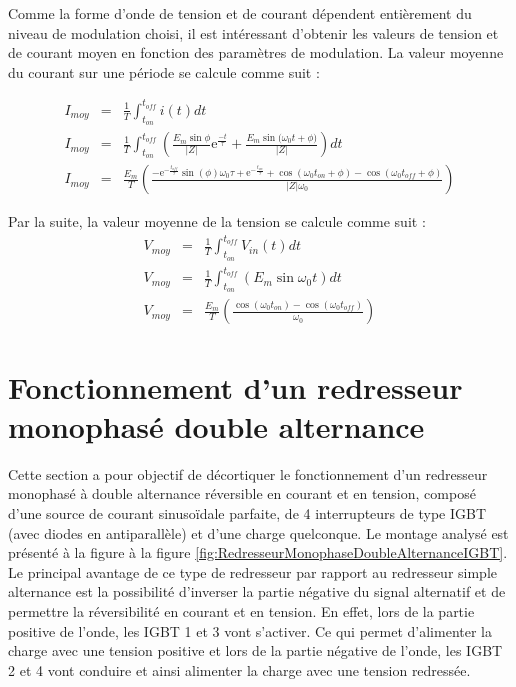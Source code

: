 Comme la forme d'onde de tension et de courant dépendent entièrement du niveau de modulation choisi, il est intéressant d'obtenir les valeurs de tension et de courant moyen en fonction des paramètres de modulation. La valeur moyenne du courant sur une période se calcule comme suit :

\begin{eqnarray}
I_{moy} &=& \frac{1}{T}\int_{t_{on}}^{t_{off}} i(t) dt \\
I_{moy} &=& \frac{1}{T}\int_{t_{on}}^{t_{off}} \left( \frac{E_m\sin{\phi}}{|Z|}\mbox{e}^{\frac{-t}{\tau}} + \frac{E_m\sin{(\omega_0 t + \phi})}{|Z|}\right) dt \\
I_{moy} &=& \frac{E_m}{T} \left( \frac{-\mbox{e}^{-\frac{t_{off}}{\tau}}\sin{(\phi)}\omega_0 \tau + \mbox{e}^{-\frac{t_{on}}{\tau}} + \cos{(\omega_0 t_{on} + \phi)}-\cos{(\omega_0 t_{off} + \phi)}}{|Z|\omega_0} \right)
\end{eqnarray}

Par la suite, la valeur moyenne de la tension se calcule comme suit : 
\begin{eqnarray}
V_{moy} &=& \frac{1}{T}\int_{t_{on}}^{t_{off}} V_{in}(t) dt \\
V_{moy} &=& \frac{1}{T}\int_{t_{on}}^{t_{off}} (E_m \sin{\omega_0 t}) dt \\
V_{moy} &=& \frac{E_m}{T} \left( \frac{\cos{(\omega_0 t_{on})} - \cos{(\omega_0 t_{off})}}{\omega_0} \right)
\end{eqnarray}

\section{Fonctionnement d'un redresseur monophasé double alternance}
Cette section a pour objectif de décortiquer le fonctionnement d'un redresseur monophasé à double alternance réversible en courant et en tension, composé d'une source de courant sinusoïdale parfaite, de 4 interrupteurs de type IGBT (avec diodes en antiparallèle) et d'une charge quelconque. Le montage analysé est présenté à la figure à la figure \ref{fig:RedresseurMonophaseDoubleAlternanceIGBT}. Le principal avantage de ce type de redresseur par rapport au redresseur simple alternance est la possibilité d'inverser la partie négative du signal alternatif et de permettre la réversibilité en courant et en tension. En effet, lors de la partie positive de l'onde, les IGBT 1 et 3 vont s'activer. Ce qui permet d'alimenter la charge avec une tension positive et lors de la partie négative de l'onde, les IGBT 2 et 4 vont conduire et ainsi alimenter la charge avec une tension redressée. 

